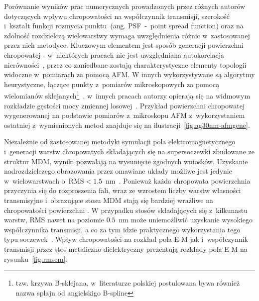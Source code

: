 Porównanie wyników prac numerycznych prowadzonych przez różnych autorów dotyczących wpływu chropowatości na współczynnik transmisji, szerokość i~kształt funkcji rozmycia punktu~(ang. PSF~-~point spread function) oraz na zdolność rozdzielczą wielowarstwy wymaga uwzględnienia różnic w~zastosowanej przez nich metodyce. Kluczowym elementem jest sposób generacji powierzchni chropowatej - w~niektórych pracach nie jest uwzględniana autokorelacja nierówności~\cite{guo2014negative}, przez co zaniedbane zostają charakterystyczne elementy topologii widoczne w~pomiarach za pomocą AFM. W innych wykorzystywane są algorytmy heurystyczne, łączące punkty z~pomiarów mikroskopowych za pomocą wielomianów sklejanych\footnote{tzw. krzywa B-sklejana, w~literaturze polskiej postulowana bywa również nazwa splajn od angielskigo B-spline}~\cite{ludwig2012impact}, w~innych pracach autorzy opierają się na widmowym rozkładzie gęstości mocy zmiennej losowej~\cite{pastuszczak2013engineering}. Przykład powierzchni chropowatej wygenerowanej na podstawie pomiarów z~mikroskopu AFM z~wykorzystaniem ostatniej z~wymienionych metod znajduje się na ilustracji~\ref{fig:ag30nm-afmgene}.

Niezależnie od zastosowanej metodyki symulacji pola elektromagnetycznego i~generacji warstw chropowatych składających się na supersoczewki zbudowane ze struktur MDM, wyniki pozwalają na wysunięcie zgodnych wniosków. Uzyskanie nadrozdzielczego obrazowania przez omawiane układy  możliwe jest jedynie w~wielowarstwach o~RMS$<1.5$~nm~\citep{guo2014negative,stefaniuk2011effect,ludwig2012impact}. Ponieważ każda chropowata powierzchnia przyczynia się do rozproszenia fali, wraz ze wzrostem liczby warstw własności transmisyjne i~obrazujące stosu MDM stają się bardziej wrażliwe na chropowatości powierzchni \cite{guo2014negative}. W przypadku stosów składających się z~kilkunastu warstw, RMS nawet na poziomie $0.5$~nm może uniemożliwić uzyskanie wysokiego współczynnika transmisji, a co za tym idzie praktycznego wykorzystania tego typu soczewek~\cite{pastuszczak2013engineering}. Wpływ chropowatości na rozkład pola E-M jak i~współczynnik transmisji przez stos metaliczno-dielektryczny prezentują rozkłady pola E-M na rysunku~\ref{fig:rmsem}.








